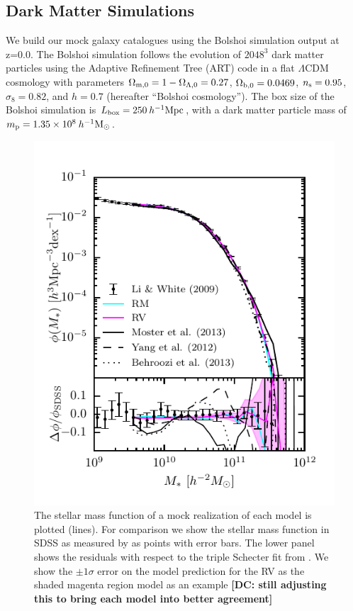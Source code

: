 \documentclass[a4paper,fleqn,usenatbib]{mnras}
\begin{document}
\subsection{Dark Matter Simulations}
\label{sec:dm_sim}

We build our mock galaxy catalogues using the Bolshoi \citep{Klypin:2011bd} simulation output at z=0.0.  The Bolshoi simulation follows the evolution of $2048^3$ dark matter particles using the Adaptive Refinement Tree (ART) code \citep*{Kravtsov:1997iy} in a flat $\Lambda$CDM cosmology with parameters $\Omega_{{\rm m},0} = 1 - \Omega_{\Lambda,0} = 0.27$, ${\Omega}_{{\rm b},0} = 0.0469$, $n_{\rm s} = 0.95$, $\sigma_8 = 0.82$, and $h = 0.7$ (hereafter ``Bolshoi cosmology''). The box size of the Bolshoi simulation is $L_{\rm box} = 250 \>h^{-1}{\rm {Mpc}}$, with a dark matter particle mass of $m_{\rm p} = 1.35 \times 10^8 \>h^{-1}\rm M_\odot$.

\begin{figure}
    \includegraphics{figures/stellar_mass_function.pdf}
    \caption{The stellar mass function of a mock realization of each model is plotted (lines).  For comparison we show the stellar mass function in SDSS as measured by \citet{Li:2009kh} as points with error bars.  The lower panel shows the residuals with respect to the triple Schecter fit from \citet{Li:2009kh}.  We show the $\pm 1 \sigma$ error on the model prediction for the RV as the shaded magenta region model as an example {\bf [DC: still adjusting this to bring each model into better agreement]}}
    \label{fig:phi}
\end{figure}
\end{document}
